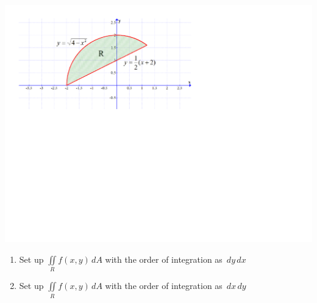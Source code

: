 \documentclass[12pt]{article}
\newif\ifans
\begin{document}
\begin{enumerate}
\begin{center}
\includegraphics[scale=0.5]{int2.pdf}
\end{center}

\begin{enumerate}

\item Set up $\iint \limits_{R} f(x,y) \,dA$ with the order of integration as $\,dy\,dx$

\ifans{\fbox{$\int_{-2}^{6/5} \int_{\frac{1}{2}(x+2)}^{\sqrt{4-x^2}} f(x,y) \,dy \,dx$}} \fi

\item Set up $\iint \limits_{R} f(x,y) \,dA$ with the order of integration as $\,dx\,dy$

\ifans{\fbox{$\int_{0}^{8/5} \int_{-\sqrt{4-y^2}}^{2y-2} f(x,y) \,dx \,dy + \int_{8/5}^{2} \int_{-\sqrt{4-y^2}}^{\sqrt{4-y^2}} f(x,y) \,dx \,dy$}} \fi

\end{enumerate}

\end{enumerate}

\end{document}
